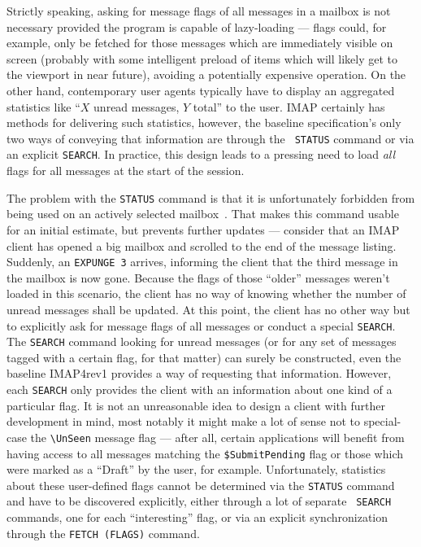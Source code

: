\documentclass[trojita]{subfiles}
\begin{document}
Strictly speaking, asking for message flags of all messages in a mailbox is not necessary provided the program is
capable of lazy-loading --- flags could, for example, only be fetched for those messages which are immediately visible on
screen (probably with some intelligent preload of items which will likely get to the viewport in near future), avoiding
a potentially expensive operation.  On the other hand, contemporary user agents typically have to display an aggregated
statistics like ``$X$ unread messages, $Y$ total'' to the user.  IMAP certainly has methods for delivering such
statistics, however, the baseline specification's only two ways of conveying that information are through the {\tt
STATUS} command or via an explicit {\tt SEARCH}.  In practice, this design leads to a pressing need to load {\em all}
flags for all messages at the start of the session.

The problem with the {\tt STATUS} command is that it is unfortunately forbidden from being used on an actively selected
mailbox~\cite[p. 43]{rfc3501}.  That makes this command usable for an initial estimate, but prevents further updates --- consider
that an IMAP client has opened a big mailbox and scrolled to the end of the message listing.  Suddenly, an {\tt *
EXPUNGE 3} arrives, informing the client that the third message in the mailbox is now gone.  Because the flags of those
``older'' messages weren't loaded in this scenario, the client has no way of knowing whether the number of unread
messages shall be updated.  At this point, the client has no other way but to explicitly ask for message flags of all
messages or conduct a special {\tt SEARCH}.  The {\tt SEARCH} command looking for unread messages (or for any set of
messages tagged with a certain flag, for that matter) can surely be constructed, even the baseline IMAP4rev1 provides a
way of requesting that information.  However, each {\tt SEARCH} only provides the client with an information about one
kind of a particular flag.  It is not an unreasonable idea to design a client with further development in mind, most
notably it might make a lot of sense not to special-case the {\tt {\textbackslash}UnSeen} message flag --- after all, certain
applications will benefit from having access to all messages matching the {\tt \$SubmitPending} flag or those which were
marked as a ``Draft'' by the user, for example.  Unfortunately, statistics about these user-defined flags cannot be
determined via the {\tt STATUS} command and have to be discovered explicitly, either through a lot of separate {\tt
SEARCH} commands, one for each ``interesting'' flag, or via an explicit synchronization through the {\tt FETCH (FLAGS)}
command.
\end{document}
